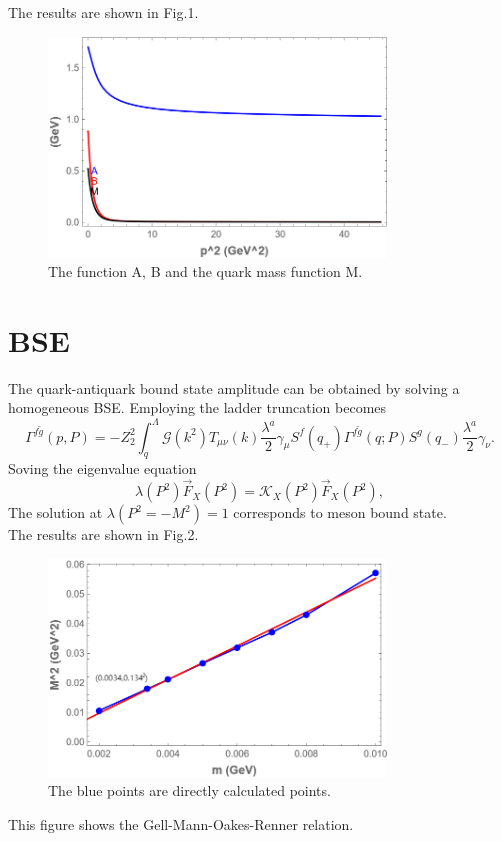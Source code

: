 \documentclass{article}
\begin{document}
The results are shown in Fig.1.
\begin{figure}[H]
    \centering
    \includegraphics[width=0.8\textwidth]{Real-dse.png}
    \caption{The function A, B and the quark mass function M.}
\end{figure}
\section{BSE}
The quark-antiquark bound state amplitude can be obtained by solving a homogeneous BSE. Employing the ladder truncation becomes
\begin{equation}
    \Gamma^{f\widetilde{g}}\left(p,P\right)=-Z_2^2\int_{q}^{\Lambda}\mathcal{G}\left(k^2\right)T_{\mu\nu}\left(k\right)\frac{\lambda^a}{2}\gamma_{\mu}S^f\left(q_+\right)\Gamma^{f\widetilde{g}}\left(q;P\right)S^g\left(q_-\right)\frac{\lambda^a}{2}\gamma_{\nu}.
\end{equation}
Soving the eigenvalue equation
\begin{equation}
    \lambda\left(P^2\right)\overrightarrow{F}_X\left(P^2\right)=\mathcal{K}_X\left(P^2\right)\overrightarrow{F}_X\left(P^2\right),
\end{equation}
The solution at $\lambda\left(P^2=-M^2\right)=1$ corresponds to meson bound state.\\
The results are shown in Fig.2.
\begin{figure}[H]
    \centering
    \includegraphics[width=0.8\textwidth]{pm-M^2.png}
    \caption{The blue points are directly calculated points.}
\end{figure}
This figure shows the Gell-Mann-Oakes-Renner relation.
\end{document}

